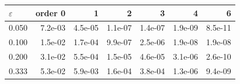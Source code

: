 \begin{tabular}{lrrrrrr}\toprule
$\varepsilon$ & order 0 & 1 & 2 & 3 & 4 & 6\\\midrule
0.050 & 7.2e-03 & 4.5e-05 & 1.1e-07 & 1.4e-07 & 1.9e-09 & 8.5e-11\\
0.100 & 1.5e-02 & 1.7e-04 & 9.9e-07 & 2.5e-06 & 1.9e-08 & 1.9e-08\\
0.200 & 3.1e-02 & 5.5e-04 & 1.5e-05 & 4.6e-05 & 3.1e-06 & 2.6e-10\\
0.333 & 5.3e-02 & 5.9e-03 & 1.6e-04 & 3.8e-04 & 1.3e-06 & 9.4e-09\\
\bottomrule\end{tabular}

